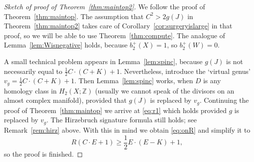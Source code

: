 \documentclass[11pt]{amsart}
\numberwithin{equation}{section}
\theoremstyle{plain}
\theoremstyle{definition}
\begin{document}
\begin{proof}[Sketch of proof of Theorem~\ref{thm:maintop2}]
We follow the proof of Theorem~\ref{thm:maintop}. The assumption that $C^2>2g(J)$ in Theorem~\ref{thm:maintop2} takes care
of Corollary~\ref{cor:surgeryislarge} in that proof, so we will be able to use Theorem~\ref{thm:compute}.
The analogue of Lemma~\ref{lem:Wisnegative} holds, because $b_2^+(X)=1$, so $b_2^+(W)=0$.

A small technical problem appears in  Lemma~\ref{lem:spinc}, because $g(J)$ is not necessarily equal to $\frac12 C\cdot(C+K)+1$.
Nevertheless, introduce the `virtual genus' $v_g=\frac12 C\cdot(C+K)+1$. Then Lemma~\ref{lem:spinc} works, when $D$ is any homology class
in $H_2(X;{\mathbb Z})$ (usually we cannot speak of the divisors on an almost complex manifold), provided that
$g(J)$ is replaced by $v_g$. Continuing the proof of Theorem~\ref{thm:maintop} we arrive at \eqref{eq:r1} which holds provided $g$
is replaced by $v_g$. The Hirzebruch signature formula still holds; see Remark~\ref{rem:hirz} above. 
With this in mind we obtain \eqref{eq:onR} and simplify it to
\[R(C\cdot E+1)\ge \frac12 E\cdot (E-K)+1,\]
so the proof is finished.
\end{proof}
\end{document}
